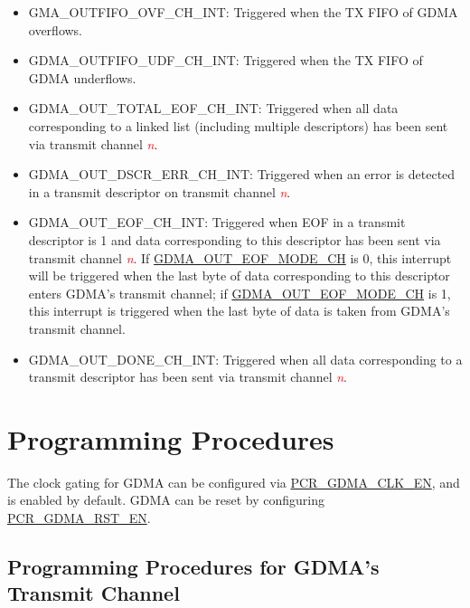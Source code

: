 \documentclass[main\_\_EN.tex]{subfiles}
\begin{document}
\begin{itemize}
\item \label{int:GDMAOUTFIFOOVFINT}GMA\_OUTFIFO\_OVF\_CH\_INT: Triggered when the TX FIFO of GDMA overflows.
\item \label{int:GDMAOUTFIFOUDFINT}GDMA\_OUTFIFO\_UDF\_CH\_INT: Triggered when the TX FIFO of GDMA underflows.
\item \label{int:GDMAOUTTOTALEOFINT}GDMA\_OUT\_TOTAL\_EOF\_CH\_INT: Triggered when all data corresponding to a linked list (including multiple descriptors) has been sent via transmit channel \textcolor{red}{\it{n}}.
\item \label{int:GDMAOUTDSCRERRINT}GDMA\_OUT\_DSCR\_ERR\_CH\_INT: Triggered when an error is detected in a transmit descriptor on transmit channel \textcolor{red}{\it{n}}.
\item \label{int:GDMAOUTEOFINT}GDMA\_OUT\_EOF\_CH\_INT: Triggered when EOF in a transmit descriptor is 1 and data corresponding to this descriptor has been sent via transmit channel \textcolor{red}{\it{n}}. If \hyperref[fielddesc:GDMAOUTEOFMODECHN]{GDMA\_OUT\_EOF\_MODE\_CH} is 0, this interrupt will be triggered when the last byte of data corresponding to this descriptor enters GDMA's transmit channel; if \hyperref[fielddesc:GDMAOUTEOFMODECHN]{GDMA\_OUT\_EOF\_MODE\_CH} is 1, this interrupt is triggered when the last byte of data is taken from GDMA's transmit channel.
\item \label{int:GDMAOUTDONEINT}GDMA\_OUT\_DONE\_CH\_INT: Triggered when all data corresponding to a transmit descriptor has been sent via transmit channel \textcolor{red}{\it{n}}.
\end{itemize}


\section{Programming Procedures}

The clock gating for GDMA can be configured via \hyperref[fielddesc:PCRGDMACLKEN]{PCR\_GDMA\_CLK\_EN}, and is enabled by default. GDMA can be reset by configuring \hyperref[fielddesc:PCRGDMARSTEN]{PCR\_GDMA\_RST\_EN}.

\subsection{Programming Procedures for GDMA's Transmit Channel}
\end{document}
